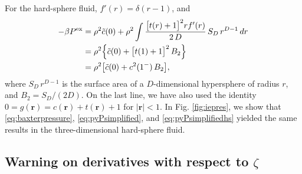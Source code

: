 \documentclass[aip,jcp,reprint,superscriptaddress]{revtex4-1}
\newcommand{\vct}[1]{\mathbf{#1}}
\providecommand{\vr}{} %
\renewcommand{\vr}{\vct{r}}
\newcommand{\supex}[1]{ { { #1 }^{ \mathrm{ex} } } }
\newcommand{\Pex}{\supex{P}}
\begin{document}
For the hard-sphere fluid,
$f'(r) = \delta(r - 1)$, and
\begin{align}
  -\beta \Pex
&=
  \rho^2 \tilde{c}(0)
  +
  \rho^2 \int
    \frac{ \big[ t(r) + 1 \big]^2 r f'(r) }
         { 2 \, D }
  \, S_D \, r^{D-1} \, dr
\notag
\\
&=
  \rho^2
  \Bigl\{
    \tilde{c}(0)
  +
  \big[ t(1) + 1 \big]^2 \, B_2
  \Bigr\}
\notag \\
&=
  \rho^2
  \bigl[
    \tilde{c}(0)
  +
    c^2(1^-) \, B_2
  \bigr],
  \label{eq:pyPsimplifiedhs}
\end{align}
%
where
$S_D \, r^{D-1}$ is the surface area of a $D$-dimensional hypersphere of radius $r$,
and $B_2 = S_D / (2D)$.
%
On the last line, we have also used the identity
$0 = g(\vr) = c(\vr) + t(\vr) + 1$
for $|\vr| < 1$.
%
In Fig. \ref{fig:iepres},
we show that
\eqref{eq:baxterpressure},
\eqref{eq:pyPsimplified},
and
\eqref{eq:pyPsimplifiedhs}
yielded the same results
in the three-dimensional hard-sphere fluid.



\subsection{Warning on derivatives with respect to $\zeta$}
\end{document}
